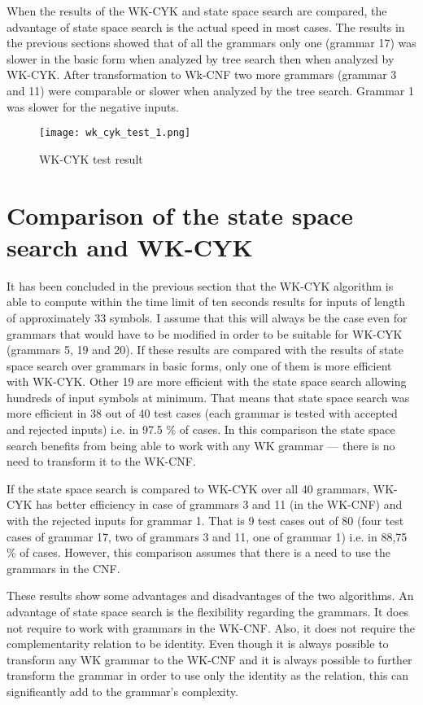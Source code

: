 When the results of the WK-CYK and state space search are compared, the advantage of state space search is the actual speed in most cases. The results in the previous sections showed that of all the grammars only one (grammar 17) was slower in the basic form when analyzed by tree search then when analyzed by WK-CYK. After transformation to Wk-CNF two more grammars (grammar 3 and 11) were comparable or slower when analyzed by the tree search. Grammar 1 was slower for the negative inputs.

\begin{figure}[h!]
  \centering
  \texttt{[image: wk\_cyk\_test\_1.png]}
  \caption{WK-CYK test result}
  \label{fig:wk_cyk_test1}
\end{figure}

\section{Comparison of the state space search and WK-CYK}

It has been concluded in the previous section that the WK-CYK algorithm is able to compute within the time limit of ten seconds results for inputs of length of approximately 33 symbols. I assume that this will always be the case even for grammars that would have to be modified in order to be suitable for WK-CYK (grammars 5, 19 and 20). If these results are compared with the results of state space search over grammars in basic forms, only one of them is more efficient with WK-CYK. Other 19 are more efficient with the state space search allowing hundreds of input symbols at minimum. That means that state space search was more efficient in 38 out of 40 test cases (each grammar is tested with accepted and rejected inputs) i.e. in 97.5 \% of cases. In this comparison the state space search benefits from being able to work with any WK grammar --- there is no need to transform it to the WK-CNF.

If the state space search is compared to WK-CYK over all 40 grammars, WK-CYK has better efficiency in case of grammars 3 and 11 (in the WK-CNF) and with the rejected inputs for grammar 1. That is 9 test cases out of 80 (four test cases of grammar 17, two of grammars 3 and 11, one of grammar 1) i.e. in 88,75 \% of cases. However, this comparison assumes that there is a need to use the grammars in the CNF.

These results show some advantages and disadvantages of the two algorithms. An advantage of state space search is the flexibility regarding the grammars. It does not require to work with grammars in the WK-CNF. Also, it does not require the complementarity relation to be identity. Even though it is always possible to transform any WK grammar to the WK-CNF and it is always possible to further transform the grammar in order to use only the identity as the relation, this can significantly add to the grammar's complexity.

